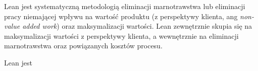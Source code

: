 Lean jest systematyczną metodologią eliminacji marnotrawstwa lub eliminacji pracy niemającej wpływu
na wartość produktu (z perspektywy klienta, ang \emph{non-value added work}) 
oraz maksymalizacji wartości.
Lean zewnętrznie skupia się na maksymalizacji wartości z perspektywy klienta, a wewnętrznie na eliminacji marnotrawstwa oraz powiązanych kosztów procesu.

Lean jest 

